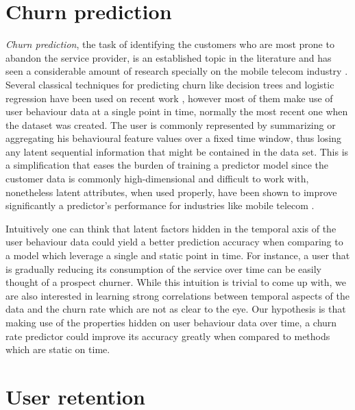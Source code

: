 \documentclass{kththesis}
\begin{document}
\section{Churn prediction}	
	
	\emph{Churn prediction}, the task of identifying the customers who are most prone to abandon the service provider, is an established topic in the literature and has seen a considerable amount of research specially on the mobile telecom industry \citep{Hassouna2015} \citep{Lu2014} \citep{Khan2015}.  Several classical techniques for predicting churn like decision trees and logistic regression have been used on recent work \citep{mahajan2015review}, however most of them make use of user behaviour data at a single point in time, normally the most recent one when the dataset was created. The user is commonly represented by summarizing or aggregating his behavioural feature values over a fixed time window, thus losing any latent sequential information that might be contained in the data set. This is a simplification that eases the burden of training a predictor model since the customer data is commonly high-dimensional and difficult to work with, nonetheless latent attributes, when used properly, have been shown to improve significantly a predictor's performance for industries like mobile telecom \citep{GurAli2014}.
    
    Intuitively one can think that latent factors hidden in the temporal axis of the user behaviour data could yield a better prediction accuracy when comparing to a model which leverage a single and static point in time. For instance, a user that is gradually reducing its consumption of the service over time can be easily thought of a prospect churner. While this intuition is trivial to come up with, we are also interested in learning strong correlations between temporal aspects of the data and the churn rate which are not as clear to the eye. Our hypothesis is that making use of the properties hidden on user behaviour data over time, a churn rate predictor could improve its accuracy greatly when compared to methods which are static on time. 
    
\section{User retention}    
    
\end{document}
